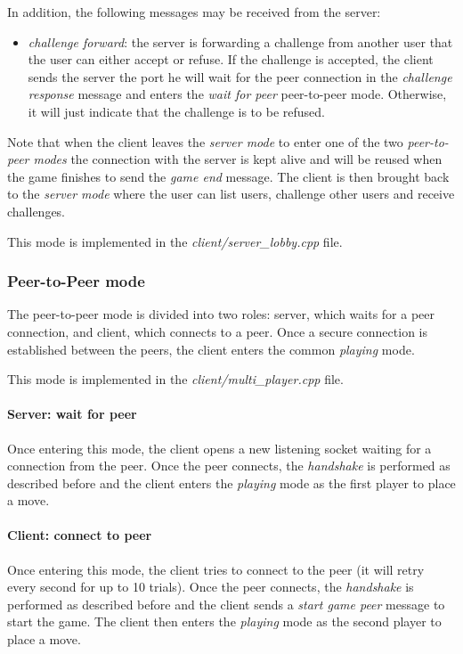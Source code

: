 In addition, the following messages may be received from the server:
\begin{itemize}
    \item \emph{challenge forward}: the server is forwarding a challenge from 
        another user that the user can either accept or refuse. If the 
        challenge is accepted, the client sends the server the port he will 
        wait for the peer connection in the \emph{challenge response} 
        message and enters the \emph{wait for peer} peer-to-peer mode.
        Otherwise, it will just indicate that the challenge is to be
        refused.
\end{itemize}

Note that when the client leaves the \emph{server mode} to enter one of the 
two \emph{peer-to-peer modes} the connection with the server is kept alive 
and will be reused when the game finishes to send the \emph{game end} message.
The client is then brought back to the \emph{server mode} where the user 
can list users, challenge other users and receive challenges.

This mode is implemented in the \emph{client/server\_lobby.cpp} file.

\subsubsection{Peer-to-Peer mode}
The peer-to-peer mode is divided into two roles: server, which waits for a peer
connection, and client, which connects to a peer. Once a secure connection is 
established between the peers, the client enters the common \emph{playing} mode.

This mode is implemented in the \emph{client/multi\_player.cpp} file.

\paragraph{Server: wait for peer}
Once entering this mode, the client opens a new listening socket waiting for 
a connection from the peer. Once the peer connects, the \emph{handshake} is 
performed as described before and the client enters the \emph{playing} mode as 
the first player to place a move.

\paragraph{Client: connect to peer}
Once entering this mode, the client tries to connect to the peer (it will retry 
every second for up to 10 trials). 
Once the peer connects, the \emph{handshake} is performed as described before 
and the client sends a \emph{start game peer} message to start the game.
The client then enters the \emph{playing} mode as the second player to place a 
move.

